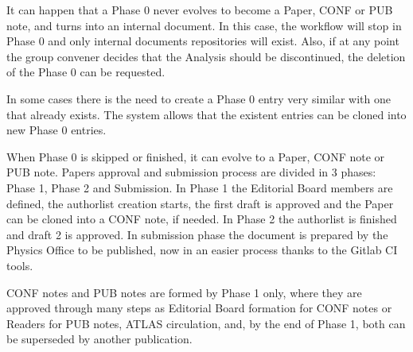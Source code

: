 It can happen that a Phase 0 never evolves to become a Paper, CONF or PUB note, and turns into an internal document. In this case, the workflow will stop in Phase 0 and only internal documents repositories will exist. Also, if at any point the group convener decides that the Analysis should be discontinued, the deletion of the Phase 0 can be requested.

In some cases there is the need to create a Phase 0 entry very similar with one that already exists. The system allows that the existent entries can be cloned into new Phase 0 entries.

When Phase 0 is skipped or finished, it can evolve to a Paper, CONF note or PUB note. Papers approval and submission process are divided in 3 phases: Phase 1, Phase 2 and Submission. In Phase 1 the Editorial Board members are defined, the authorlist creation starts, the first draft is approved and the Paper can be cloned into a CONF note, if needed. In Phase 2 the authorlist is finished and draft 2 is approved. In submission phase the document is prepared by the Physics Office to be published, now in an easier process thanks to the Gitlab CI tools.

CONF notes and PUB notes are formed by Phase 1 only, where they are approved through many steps as Editorial Board formation for CONF notes or Readers for PUB notes, ATLAS circulation, and, by the end of Phase 1, both can be superseded by another publication.